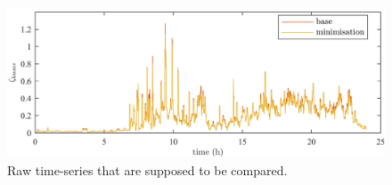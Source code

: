 \begin{figure}\centering
	\includegraphics{_appendices/_a1/fig/raw-cost}
	\caption{Raw time-series that are supposed to be compared.}
	\label{appx-a:ch1:fig:raw-data}
\end{figure}